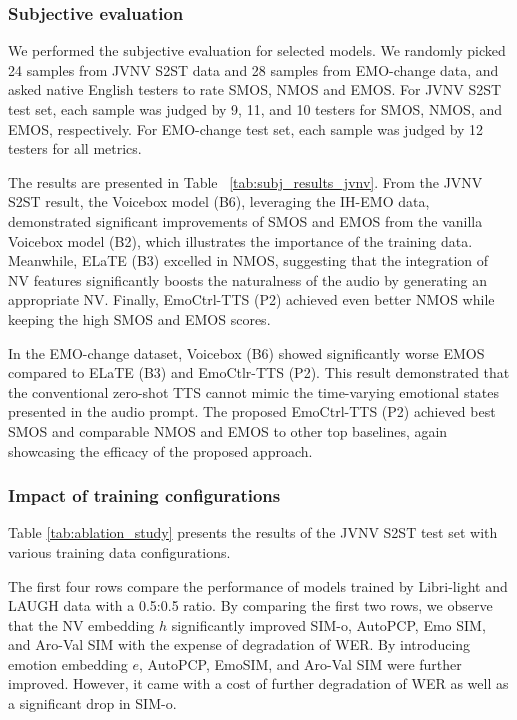 \vspace{-.5em}
\subsubsection{Subjective evaluation}
\vspace{-.5em}

We performed the subjective evaluation for selected models.
We randomly picked 24 samples from JVNV S2ST data and 28 samples from EMO-change data, and asked native English testers to rate SMOS, NMOS and EMOS.
For JVNV S2ST test set, each sample was judged by 9, 11, and 10 testers for SMOS, NMOS, and EMOS, respectively. For EMO-change test set, each sample was judged by 12 testers for all metrics. 

The results are presented in Table ~\ref{tab:subj_results_jvnv}. 
From the JVNV S2ST result, the Voicebox model (B6), leveraging the IH-EMO data, demonstrated significant improvements of SMOS and EMOS from the vanilla Voicebox model (B2), which illustrates the importance of the training data. Meanwhile, ELaTE (B3) excelled in NMOS, suggesting that the integration of NV features significantly boosts the naturalness of the audio by generating an appropriate NV.
Finally, EmoCtrl-TTS (P2) achieved even better NMOS while keeping the high SMOS and EMOS scores.

In the EMO-change dataset, 
Voicebox (B6) showed significantly worse EMOS
compared to ELaTE (B3) and EmoCtlr-TTS (P2).
This result demonstrated that 
the conventional zero-shot TTS 
cannot mimic the time-varying
emotional states presented in the 
audio prompt.
The proposed EmoCtrl-TTS (P2) 
achieved best SMOS and
comparable NMOS and EMOS to other top 
baselines, again showcasing the
efficacy of the proposed approach.



\vspace{-.5em}
\subsubsection{Impact of training configurations}
\label{ssec:train-config}
\vspace{-.5em}


Table \ref{tab:ablation_study} presents the results of the JVNV S2ST test set with various training data configurations. 

The first four rows compare the performance of models trained by Libri-light and LAUGH data with a 0.5:0.5 ratio. By comparing the first two rows, we observe that the NV embedding $h$  significantly improved SIM-o, AutoPCP, Emo SIM, and Aro-Val SIM with the expense of degradation of WER. By introducing emotion embedding $e$, AutoPCP, EmoSIM, and Aro-Val SIM were further improved. However, it came with a cost of further degradation of WER as well as a significant drop in SIM-o.
    
